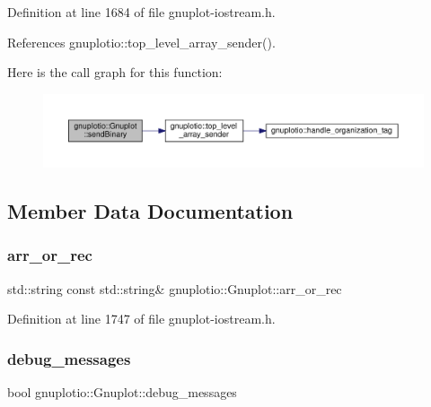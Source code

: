 Definition at line 1684 of file gnuplot-\/iostream.\+h.



References gnuplotio\+::top\+\_\+level\+\_\+array\+\_\+sender().

Here is the call graph for this function\+:\nopagebreak
\begin{figure}[H]
\begin{center}
\leavevmode
\includegraphics[width=350pt]{classgnuplotio_1_1_gnuplot_a46c9e01d2030768cd811d2e8dbd10dfa_cgraph}
\end{center}
\end{figure}


\subsection{Member Data Documentation}
\mbox{\label{classgnuplotio_1_1_gnuplot_a2d194dbd4d2f3475ff6f9b8384e62a9f}} 
\subsubsection{\texorpdfstring{arr\+\_\+or\+\_\+rec}{arr\_or\_rec}}
{\footnotesize\ttfamily std\+::string const std\+::string\& gnuplotio\+::\+Gnuplot\+::arr\+\_\+or\+\_\+rec}



Definition at line 1747 of file gnuplot-\/iostream.\+h.

\mbox{\label{classgnuplotio_1_1_gnuplot_a63e08bfd0cd02937d895ecfb6180107c}} 
\subsubsection{\texorpdfstring{debug\+\_\+messages}{debug\_messages}}
{\footnotesize\ttfamily bool gnuplotio\+::\+Gnuplot\+::debug\+\_\+messages}



